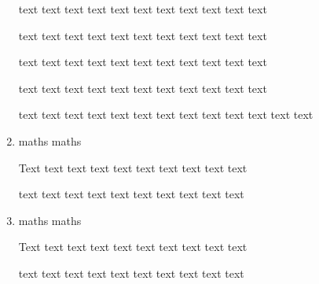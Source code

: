 \documentclass[12pt,a4paper,openany]{report}
\begin{document}
\begin{exercise}
\begin{enumerate}
	text text text text text text text text text text text
	
	text text text text text text text text text text text
	
	text text text text text text text text text text text
	
	text text text text text text text text text text text
	
	text text text text text text text text text text text text text
	\item
	
	maths maths
	
	Text text text text text text text text text text 
	
	text text text text text text text text text text
	
	\item 
	
	maths maths
	
	Text text text text text text text text text text 
	
	text text text text text text text text text text
	
	
\end{enumerate}
\end{exercise}
\end{document}
